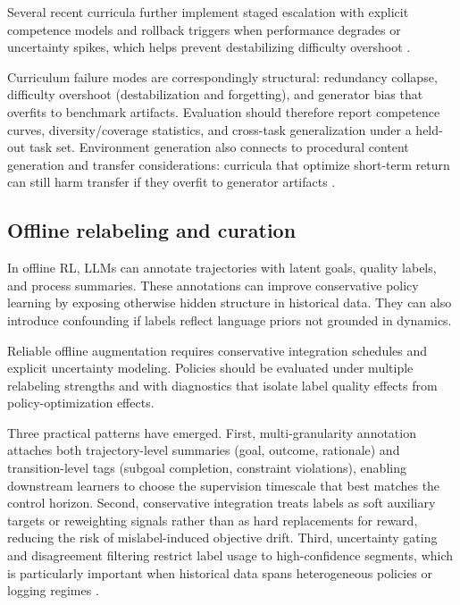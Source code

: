 ﻿\documentclass[conference]{IEEEtran}
\begin{document}
Several recent curricula further implement staged escalation with explicit competence models and rollback triggers when performance degrades or uncertainty spikes, which helps prevent destabilizing difficulty overshoot \cite{arxiv_p_2602_10576}.

Curriculum failure modes are correspondingly structural: redundancy collapse, difficulty overshoot (destabilization and forgetting), and generator bias that overfits to benchmark artifacts. Evaluation should therefore report competence curves, diversity/coverage statistics, and cross-task generalization under a held-out task set. Environment generation also connects to procedural content generation and transfer considerations: curricula that optimize short-term return can still harm transfer if they overfit to generator artifacts \cite{doi_p_10_60602_1887_4282228}.

\subsection{Offline relabeling and curation}
In offline RL, LLMs can annotate trajectories with latent goals, quality labels, and process summaries. These annotations can improve conservative policy learning by exposing otherwise hidden structure in historical data. They can also introduce confounding if labels reflect language priors not grounded in dynamics.

Reliable offline augmentation requires conservative integration schedules and explicit uncertainty modeling. Policies should be evaluated under multiple relabeling strengths and with diagnostics that isolate label quality effects from policy-optimization effects.

Three practical patterns have emerged. First, multi-granularity annotation attaches both trajectory-level summaries (goal, outcome, rationale) and transition-level tags (subgoal completion, constraint violations), enabling downstream learners to choose the supervision timescale that best matches the control horizon. Second, conservative integration treats labels as soft auxiliary targets or reweighting signals rather than as hard replacements for reward, reducing the risk of mislabel-induced objective drift. Third, uncertainty gating and disagreement filtering restrict label usage to high-confidence segments, which is particularly important when historical data spans heterogeneous policies or logging regimes \cite{arxiv_p_2602_02137,arxiv_p_2310_20587,arxiv_p_2601_03205,arxiv_p_2602_03305}.
\end{document}
